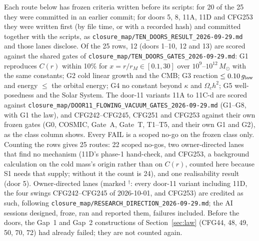 \documentclass[10pt]{article}
\newcommand{\fpath}[1]{\nolinkurl{#1}}
\begin{document}
Each route below has frozen criteria written before its scripts: for 20 of the 25 they were committed in an earlier commit; for doors 5, 8, 11A, 11D and CFG253 they were written first (by file time, or with a recorded hash) and committed together with the scripts, as \fpath{closure_map/TEN_DOORS_RESULT_2026-09-29.md} and those lanes disclose. Of the 25 rows, 12 (doors 1--10, 12 and 13) are scored against the shared gates of \fpath{closure_map/TEN_DOORS_GATES_2026-09-29.md}: G1 reproduces $C(r)$ within 10\% for $x=r/r_M\in[0.1,30]$ over $10^9$--$10^{12}\,M_\odot$ with the same constants; G2 cold linear growth and the CMB; G3 reaction $\le0.10\,g_{\rm law}$ and energy $\le$ the orbital energy; G4 no constant beyond $\kappa$ and $\Omega_ch^2$; G5 well-posedness and the Solar System. The door-11 variants 11A to 11C-d are scored against \fpath{closure_map/DOOR11_FLOWING_VACUUM_GATES_2026-09-29.md} (G1--G8, with G1 the law), and CFG242--CFG245, CFG251 and CFG253 against their own frozen gates (G0, COSMIC, Gate~A, Gate~T, T1--T5, and their own G1 and G2), as the class column shows. Every FAIL is a scoped no-go on the frozen class only. Counting the rows gives 25 routes: 22 scoped no-gos, two owner-directed lanes that find no mechanism (11D's phase-1 hand-check, and CFG253, a background calculation on the cold mass's origin rather than on $C(r)$, counted here because S1 needs that supply; without it the count is 24), and one realisability result (door 5). Owner-directed lanes (marked $^\dagger$: every door-11 variant including 11D, the four swings CFG242--CFG245 of 2026-10-01, and CFG253) are credited as such, following \fpath{closure_map/RESEARCH_DIRECTION_2026-09-29.md}; the AI sessions designed, froze, ran and reported them, failures included. Before the doors, the Gap~1 and Gap~2 constructions of Section~\ref{sec:law} (CFG44, 48, 49, 50, 70, 72) had already failed; they are not counted again.
\end{document}
